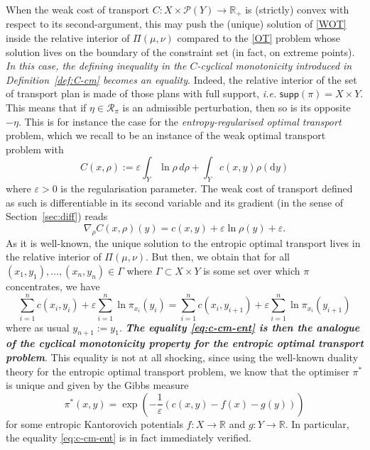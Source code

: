 \documentclass[leqno, 11pt, a4paper]{amsart}
\theoremstyle{definition}
\newcommand{\cR}{\mathcal{R}}
\newcommand{\R}{\mathbb{R}}
\newcommand{\eps}{\varepsilon}
\newcommand{\cP}{\mathcal{P}}
\newcommand{\supp}{\textsf{supp}}
\newcommand{\dd}{\mathrm{d}}
\begin{document}
When the weak cost of transport $C : X \times \cP(Y) \to \R_+$ is (strictly) convex with respect to its second-argument, this may push the (unique) solution of \eqref{WOT} inside the relative interior of $\Pi(\mu, \nu)$ compared to the \eqref{OT} problem whose solution lives on the boundary of the constraint set (in fact, on extreme points).  \textit{In this case, the defining inequality in the $C$-cyclical monotonicity introduced in Definition~\ref{def:C-cm} becomes an equality}. Indeed, the relative interior of the set of transport plan is made of those plans with full support, \textit{i.e.} $\supp(\pi) = X \times Y$. This means that if $\eta \in \cR_\pi$ is an admissible perturbation, then so is its opposite $-\eta$. This is for instance the case for the \textit{entropy-regularised optimal transport} problem, which we recall to be an instance of the weak optimal transport problem with 
$$
C(x, \rho) := \eps \int_{Y} \ln \rho \, d \rho + \int_Y c(x, y) \rho(\dd y)
$$
where $\eps > 0$ is the regularisation parameter. The weak cost of transport defined as such is differentiable in its second variable and its gradient (in the sense of Section~\ref{sec:diff}) reads
$$\nabla_\rho C(x, \rho)(y) = c(x, y) + \eps \ln \rho(y) + \eps.$$ 
As it is well-known, the unique solution to the entropic optimal transport lives in the relative interior of $\Pi(\mu, \nu)$. But then, we obtain that for all $(x_1, y_1), \dots, (x_n, y_n) \in \Gamma$ where $\Gamma \subset X \times Y$ is some set over which $\pi$ concentrates, we have 
\begin{equation}\label{eq:c-cm-ent}
	\boxed{\sum_{i = 1}^n c(x_i, y_{i}) + \eps \sum_{i = 1}^n \ln \pi_{x_i}(y_i) = \sum_{i = 1}^n c(x_i, y_{i+1}) + \eps \sum_{i = 1}^n \ln \pi_{x_i}(y_{i+1}) }
\end{equation}
	where as usual $y_{n+1} := y_1$. \textbf{\textit{The equality \eqref{eq:c-cm-ent} is then the analogue of the cyclical monotonicity property for the entropic optimal transport problem}}. This equality is not at all shocking, since using the well-known duality theory for the entropic optimal transport problem, we know that the optimiser $\pi^*$ is unique and given by the Gibbs measure $$\pi^*(x, y) = \exp\left(-\frac1\eps(c(x, y) - f(x) - g(y))\right)$$ for some entropic Kantorovich potentials $f : X \to \R$ and $g : Y \to \R$. In particular, the equality \eqref{eq:c-cm-ent} is in fact immediately verified. 

\appendix
\end{document}
